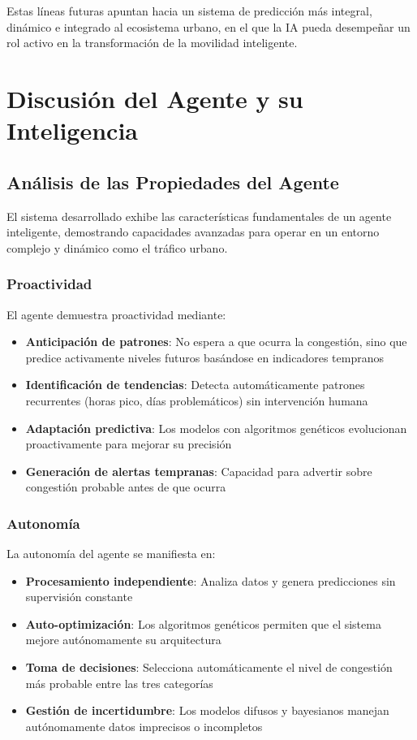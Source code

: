 \documentclass{svproc} %
\begin{document}
Estas líneas futuras apuntan hacia un sistema de predicción más integral, dinámico e integrado al ecosistema urbano, en el que la IA pueda desempeñar un rol activo en la transformación de la movilidad inteligente.

\section{Discusión del Agente y su Inteligencia}

\subsection{Análisis de las Propiedades del Agente}

El sistema desarrollado exhibe las características fundamentales de un agente inteligente, demostrando capacidades avanzadas para operar en un entorno complejo y dinámico como el tráfico urbano.

\subsubsection{Proactividad}

El agente demuestra proactividad mediante:
\begin{itemize}
    \item \textbf{Anticipación de patrones}: No espera a que ocurra la congestión, sino que predice activamente niveles futuros basándose en indicadores tempranos
    \item \textbf{Identificación de tendencias}: Detecta automáticamente patrones recurrentes (horas pico, días problemáticos) sin intervención humana
    \item \textbf{Adaptación predictiva}: Los modelos con algoritmos genéticos evolucionan proactivamente para mejorar su precisión
    \item \textbf{Generación de alertas tempranas}: Capacidad para advertir sobre congestión probable antes de que ocurra
\end{itemize}

\subsubsection{Autonomía}

La autonomía del agente se manifiesta en:
\begin{itemize}
    \item \textbf{Procesamiento independiente}: Analiza datos y genera predicciones sin supervisión constante
    \item \textbf{Auto-optimización}: Los algoritmos genéticos permiten que el sistema mejore autónomamente su arquitectura
    \item \textbf{Toma de decisiones}: Selecciona automáticamente el nivel de congestión más probable entre las tres categorías
    \item \textbf{Gestión de incertidumbre}: Los modelos difusos y bayesianos manejan autónomamente datos imprecisos o incompletos
\end{itemize}
\end{document}
